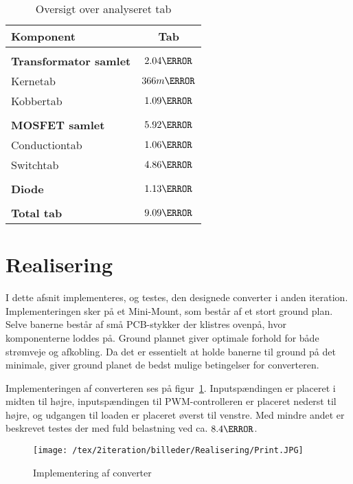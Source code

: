 \begin{table}[H] 			
	\centering
	\begin{tabularx}{\textwidth}{|X|c|}
		\hline
		\textbf{\large Komponent} & {\textbf{\large Tab}} \\ \hline
		& 	\\ \hline
		\textbf{Transformator samlet} & $2.04\watt$ \\ \hline 
		Kernetab & $366m\watt$ \\ \hline
		Kobbertab & $1.09\watt$ \\ \hline
		& 	\\ \hline
		\textbf{MOSFET samlet} & $5.92\watt$ \\ \hline
		Conductiontab & $1.06\watt$ \\ \hline
		Switchtab & $4.86\watt$ \\ \hline
		& 	\\ \hline
		\textbf{Diode} & $1.13\watt$ \\ \hline
		& 	\\ \hline
		\textbf{Total tab} & $9.09\watt$ \\ \hline
	\end{tabularx}
	\caption{Oversigt over analyseret tab}
	\label{tab:analyseret}
\end{table}



\clearpage 

\section{Realisering}
I dette afsnit implementeres, og testes, den designede converter i anden iteration. Implementeringen sker på et Mini-Mount, som består af et stort ground plan. Selve banerne består af små PCB-stykker der klistres ovenpå, hvor komponenterne loddes på. Ground plannet giver optimale forhold for både strømveje og afkobling. Da det er essentielt at holde banerne til ground på det minimale, giver ground planet de bedst mulige betingelser for converteren. 

Implementeringen af converteren ses på figur~\ref{fig:Mini_Mount}. Inputspændingen er placeret i midten til højre, inputspændingen til PWM-controlleren er placeret nederst til højre, og udgangen til loaden er placeret øverst til venstre. Med mindre andet er beskrevet testes der med fuld belastning ved ca. $8.4\ohm$.

\begin{figure}[H]
	\center
	\texttt{[image: /tex/2iteration/billeder/Realisering/Print.JPG]}
	\caption{Implementering af converter}
	\label{fig:Mini_Mount}
\end{figure}


